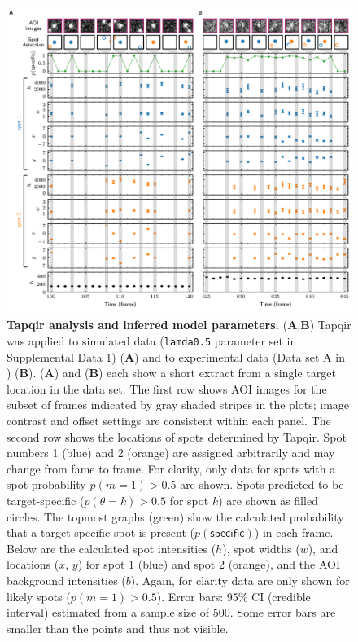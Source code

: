 \begin{figure}
\begin{fullwidth}
\includegraphics[width=183mm]{figures/tapqir_analysis.png}
\caption{\textbf{Tapqir analysis and inferred model parameters.} (\textbf{A},\textbf{B}) Tapqir was applied to simulated data (\texttt{lamda0.5} parameter set in Supplemental Data 1) (\textbf{A}) and to experimental data (Data set A in ) (\textbf{B}). (\textbf{A}) and (\textbf{B}) each show a short extract from a single target location in the data set. The first row shows AOI images for the subset of frames indicated by gray shaded stripes in the plots; image contrast and offset settings are consistent within each panel. The second row shows the locations of spots determined by Tapqir. Spot numbers 1 (blue) and 2 (orange) are assigned arbitrarily and may change from fame to frame. For clarity, only data for spots with a spot probability $p(m=1) > 0.5$ are shown. Spots predicted to be target-specific ($p(\theta=k)>0.5$ for spot $k$) are shown as filled circles. The topmost graphs (green) show the calculated probability that a target-specific spot is present ($p(\mathsf{specific})$) in each frame.  Below are the calculated spot intensities ($h$), spot widths ($w$), and locations ($x$, $y$) for spot 1 (blue) and spot 2 (orange), and the AOI background intensities ($b$).  Again, for clarity data are only shown for likely spots ($p(m=1) > 0.5$). Error bars: 95\% CI (credible interval) estimated from a sample size of 500.  Some error bars are smaller than the points and thus not visible.}
\label{fig:tapqir_analysis}


\end{fullwidth}
\end{figure}
